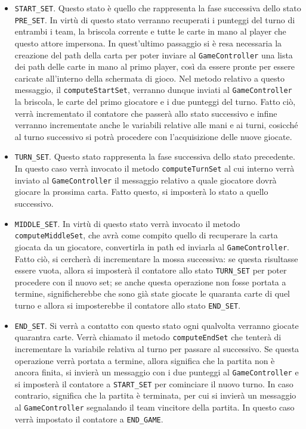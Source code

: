 \begin{itemize}
\begin {itemize}
     \item \texttt{START\_SET}. Questo stato è quello che rappresenta la fase successiva dello stato \texttt{PRE\_SET}. In virtù di questo stato verranno recuperati i punteggi del turno di entrambi i team, la briscola corrente e tutte le carte in mano al player che questo attore impersona. In quest'ultimo passaggio si è resa necessaria la creazione del path della carta per poter inviare al \texttt{GameController} una lista dei path delle carte in mano al primo player, così da essere pronte per essere caricate all'interno della schermata di gioco. Nel metodo relativo a questo messaggio, il \texttt{computeStartSet}, verranno dunque inviati al \texttt{GameController} la briscola, le carte del primo giocatore e i due punteggi del turno. Fatto ciò, verrà incrementato il contatore che passerà allo stato successivo e infine verranno incrementate anche le variabili relative alle mani e ai turni, cosicché al turno successivo si potrà procedere con l'acquisizione delle nuove giocate.
     
   \item \texttt{TURN\_SET}. Questo stato rappresenta la fase successiva dello stato precedente. In questo caso verrà invocato il metodo \texttt{computeTurnSet} al cui interno verrà inviato al \texttt{GameController} il messaggio relativo a quale giocatore dovrà giocare la prossima carta. Fatto questo, si imposterà lo stato a quello successivo.
     
     \item \texttt{MIDDLE\_SET}. In virtù di questo stato verrà invocato il metodo \texttt{computeMiddleSet}, che avrà come compito quello di recuperare la carta giocata da un giocatore, convertirla in path ed inviarla al \texttt{GameController}. Fatto ciò, si cercherà di incrementare la mossa successiva: se questa risultasse essere vuota, allora si imposterà il contatore allo stato \texttt{TURN\_SET} per poter procedere con il nuovo set; se anche questa operazione non fosse portata a termine, significherebbe che sono già state giocate le quaranta carte di quel turno e allora si imposterebbe il contatore allo stato \texttt{END\_SET}.
     
     \item \texttt{END\_SET}. Si verrà a contatto con questo stato ogni qualvolta verranno giocate quarantra carte. Verrà chiamato il metodo \texttt{computeEndSet} che tenterà di incrementare la variabile relativa al turno per passare al successivo. Se questa operazione verrà portata a termine, allora significa che la partita non è ancora finita, si invierà un messaggio con i due punteggi al \texttt{GameController} e si imposterà il contatore a \texttt{START\_SET} per cominciare il nuovo turno. In caso contrario, significa che la partita è terminata, per cui si invierà un messaggio al \texttt{GameController} segnalando il team vincitore della partita. In questo caso verrà impostato il contatore a \texttt{END\_GAME}.
     

\end{itemize}
\end{itemize}
